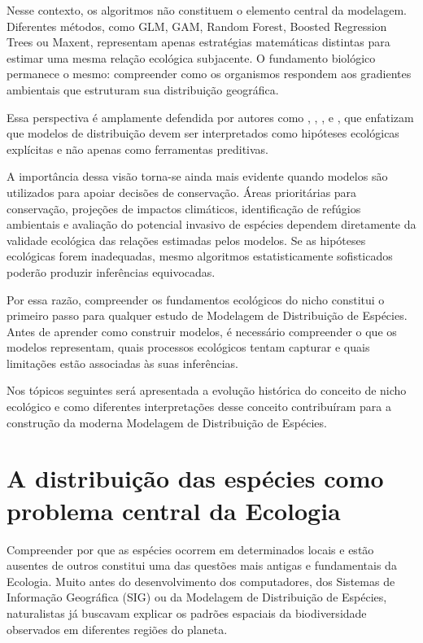 Nesse contexto, os algoritmos não constituem o elemento central da modelagem. Diferentes métodos, como GLM, GAM, Random Forest, Boosted Regression Trees ou Maxent, representam apenas estratégias matemáticas distintas para estimar uma mesma relação ecológica subjacente. O fundamento biológico permanece o mesmo: compreender como os organismos respondem aos gradientes ambientais que estruturam sua distribuição geográfica.

Essa perspectiva é amplamente defendida por autores como \textcite{guisan2005predicting}, \textcite{elith2009}, \textcite{peterson2011}, \textcite{franklin2010} e \textcite{guisan2017habitat}, que enfatizam que modelos de distribuição devem ser interpretados como hipóteses ecológicas explícitas e não apenas como ferramentas preditivas.

A importância dessa visão torna-se ainda mais evidente quando modelos são utilizados para apoiar decisões de conservação. Áreas prioritárias para conservação, projeções de impactos climáticos, identificação de refúgios ambientais e avaliação do potencial invasivo de espécies dependem diretamente da validade ecológica das relações estimadas pelos modelos. Se as hipóteses ecológicas forem inadequadas, mesmo algoritmos estatisticamente sofisticados poderão produzir inferências equivocadas.

Por essa razão, compreender os fundamentos ecológicos do nicho constitui o primeiro passo para qualquer estudo de Modelagem de Distribuição de Espécies. Antes de aprender como construir modelos, é necessário compreender o que os modelos representam, quais processos ecológicos tentam capturar e quais limitações estão associadas às suas inferências.

Nos tópicos seguintes será apresentada a evolução histórica do conceito de nicho ecológico e como diferentes interpretações desse conceito contribuíram para a construção da moderna Modelagem de Distribuição de Espécies.

\section{A distribuição das espécies como problema central da Ecologia}

Compreender por que as espécies ocorrem em determinados locais e estão ausentes de outros constitui uma das questões mais antigas e fundamentais da Ecologia. Muito antes do desenvolvimento dos computadores, dos Sistemas de Informação Geográfica (SIG) ou da Modelagem de Distribuição de Espécies, naturalistas já buscavam explicar os padrões espaciais da biodiversidade observados em diferentes regiões do planeta.

